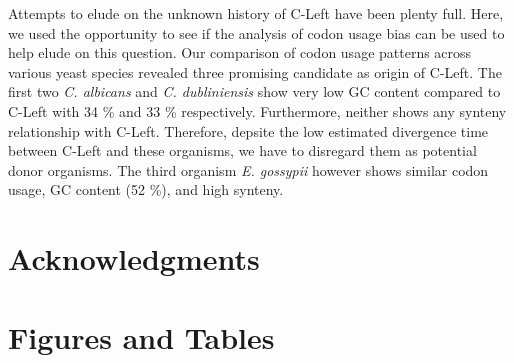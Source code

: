 \documentclass[letter,12pt]{article}
\begin{document}
Attempts to elude on the unknown history of C-Left have been plenty full.
Here, we used the opportunity to see if the analysis of codon usage bias can be used to help elude on this question.
Our comparison of codon usage patterns across various yeast species revealed three promising candidate as origin of C-Left.
The first two \textit{C. albicans} and \textit{C. dubliniensis} show very low GC content compared to C-Left with 34 \% and 33 \% respectively. 
Furthermore, neither shows any synteny relationship with C-Left.
Therefore, depsite the low estimated divergence time between C-Left and these organisms, we have to disregard them as potential donor organisms. 
The third organism \textit{E. gossypii} however shows similar codon usage, GC content (52 \%), and high synteny.  

\section{Acknowledgments}






\section{Figures and Tables}
\end{document}
